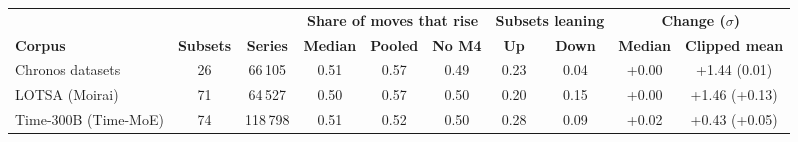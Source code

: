 \begin{tabular}{@{}lccccccccc@{}}
\toprule
 & & & \multicolumn{3}{c}{\textbf{Share of moves that rise}} & \multicolumn{2}{c}{\textbf{Subsets leaning}} & \multicolumn{2}{c}{\textbf{Change ($\sigma$)}} \\
\cmidrule(lr){4-6}\cmidrule(lr){7-8}\cmidrule(lr){9-10}
\textbf{Corpus} & \textbf{Subsets} & \textbf{Series} & \textbf{Median} & \textbf{Pooled} & \textbf{No M4} & \textbf{Up} & \textbf{Down} & \textbf{Median} & \textbf{Clipped mean} \\
\midrule
Chronos datasets & 26 & 66\,105 & 0.51 & 0.57 & 0.49 & 0.23 & 0.04 & +0.00 & +1.44 (\textminus{}0.01) \\
LOTSA (Moirai) & 71 & 64\,527 & 0.50 & 0.57 & 0.50 & 0.20 & 0.15 & +0.00 & +1.46 (+0.13) \\
Time-300B (Time-MoE) & 74 & 118\,798 & 0.51 & 0.52 & 0.50 & 0.28 & 0.09 & +0.02 & +0.43 (+0.05) \\
\bottomrule
\end{tabular}
